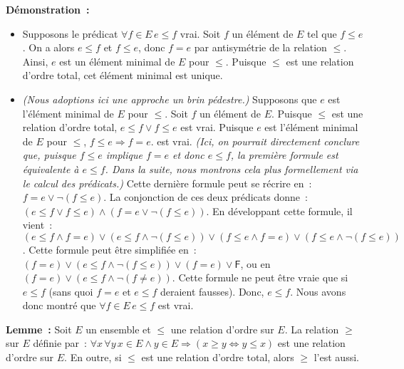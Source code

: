\noindent\textbf{Démonstration :}
\begin{itemize}[nosep]
    \item Supposons le prédicat $\forall f \in E \, e \leq f$ vrai. 
        Soit $f$ un élément de $E$ tel que $f \leq e$. 
        On a alors $e \leq f$ et $f \leq e$, donc $f = e$ par antisymétrie de la relation $\leq$. 
        Ainsi, $e$ est un élément minimal de $E$ pour $\leq$.
        Puisque $\leq$ est une relation d'ordre total, cet élément minimal est unique.
    \item \textit{(Nous adoptions ici une approche un brin pédestre.)} 
        Supposons que $e$ est l'élément minimal de $E$ pour $\leq$.
        Soit $f$ un élément de $E$. 
        Puisque $\leq$ est une relation d'ordre total, $e \leq f \vee f \leq e$ est vrai.
        Puisque $e$ est l'élément minimal de $E$ pour $\leq$, $f \leq e \Rightarrow f = e$. est vrai. 
        \textit{(Ici, on pourrait directement conclure que, puisque $f \leq e$ implique $f = e$ et donc $e \leq f$, la première formule est équivalente à $e \leq f$. Dans la suite, nous montrons cela plus formellement \emph{via} le calcul des prédicats.)}
        Cette dernière formule peut se récrire en : $f = e \vee \neg (f \leq e)$.
        La conjonction de ces deux prédicats donne : $(e \leq f \vee f \leq e) \wedge (f = e \vee \neg (f \leq e))$.
        En développant cette formule, il vient : $(e \leq f \wedge f = e) \vee (e \leq f \wedge \neg (f \leq e)) \vee (f \leq e \wedge f = e) \vee (f \leq e \wedge \neg (f \leq e))$.
        Cette formule peut être simplifiée en : $(f = e) \vee (e \leq f \wedge \neg (f \leq e)) \vee (f = e) \vee \mathsf{F}$, 
        ou en $(f = e) \vee (e \leq f \wedge \neg (f \neq e))$.
        Cette formule ne peut être vraie que si $e \leq f$ (sans quoi $f = e$ et $e \leq f$ deraient fausses).
        Donc, $e \leq f$.
        Nous avons donc montré que $\forall f \in E \, e \leq f$ est vrai.
\end{itemize}
    
   \done 

\medskip

\noindent\textbf{Lemme :} Soit $E$ un ensemble et $\leq$ une relation d'ordre sur $E$. 
    La relation $\geq$ sur $E$ définie par : $\forall x \, \forall y \, x \in E \wedge y \in E \Rightarrow (x \geq y \Leftrightarrow y \leq x)$ est une relation d'ordre sur $E$. 
    En outre, si $\leq$ est une relation d'ordre total, alors $\geq$ l'est aussi.

\medskip

